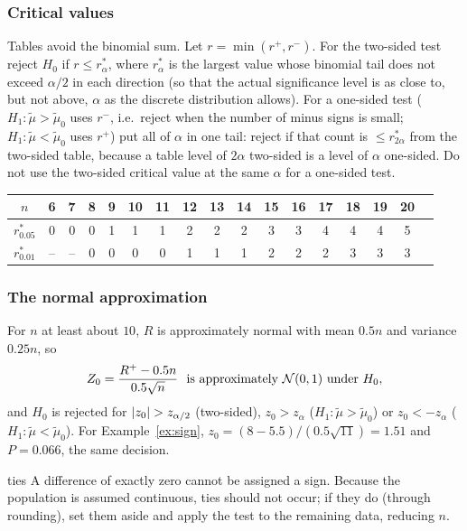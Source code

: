 \subsubsection*{Critical values}

Tables avoid the binomial sum. Let $r=\min(r^+,r^-)$. For the two-sided test reject $H_0$ if $r\le r^*_\alpha$, where $r^*_\alpha$ is the largest value whose binomial tail does not exceed $\alpha/2$ in each direction (so that the actual significance level is as close to, but not above, $\alpha$ as the discrete distribution allows). For a one-sided test ($H_1:\tilde\mu>\tilde\mu_0$ uses $r^-$, i.e.\ reject when the number of minus signs is small; $H_1:\tilde\mu<\tilde\mu_0$ uses $r^+$) put all of $\alpha$ in one tail: reject if that count is $\le r^*_{2\alpha}$ from the two-sided table, because a table level of $2\alpha$ two-sided is a level of $\alpha$ one-sided. Do not use the two-sided critical value at the same $\alpha$ for a one-sided test.

\begin{center}
\small
\begin{tabular}{c|cccccccccccccccc}
\toprule
$n$ & 6 & 7 & 8 & 9 & 10 & 11 & 12 & 13 & 14 & 15 & 16 & 17 & 18 & 19 & 20\\
\midrule
$r^*_{0.05}$ & 0 & 0 & 0 & 1 & 1 & 1 & 2 & 2 & 2 & 3 & 3 & 4 & 4 & 4 & 5\\
$r^*_{0.01}$ & -- & -- & 0 & 0 & 0 & 0 & 1 & 1 & 1 & 2 & 2 & 2 & 3 & 3 & 3\\
\bottomrule
\end{tabular}
\end{center}

\subsubsection*{The normal approximation}

For $n$ at least about $10$, $R$ is approximately normal with mean $0.5n$ and variance $0.25n$, so
\[ Z_0=\frac{R^+-0.5n}{0.5\sqrt n}\ \text{ is approximately }\mathcal{N}(0,1)\text{ under }H_0, \]
and $H_0$ is rejected for $\lvert z_0\rvert>z_{\alpha/2}$ (two-sided), $z_0>z_\alpha$ ($H_1:\tilde\mu>\tilde\mu_0$) or $z_0<-z_\alpha$ ($H_1:\tilde\mu<\tilde\mu_0$). For Example~\ref{ex:sign}, $z_0=(8-5.5)/(0.5\sqrt{11})=1.51$ and $P=0.066$, the same decision.

\begin{pitfall}{ties}
A difference of exactly zero cannot be assigned a sign. Because the population is assumed continuous, ties should not occur; if they do (through rounding), set them aside and apply the test to the remaining data, reducing $n$.
\end{pitfall}


